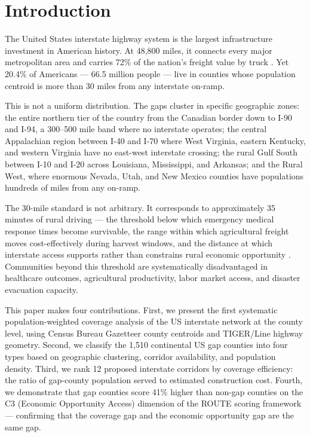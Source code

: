 \section{Introduction}

The United States interstate highway system is the largest infrastructure investment in American history. At 48,800 miles, it connects every major metropolitan area and carries 72\% of the nation's freight value by truck \citep{BTS2024}. Yet 20.4\% of Americans --- 66.5 million people --- live in counties whose population centroid is more than 30 miles from any interstate on-ramp.

This is not a uniform distribution. The gaps cluster in specific geographic zones: the entire northern tier of the country from the Canadian border down to I-90 and I-94, a 300--500 mile band where no interstate operates; the central Appalachian region between I-40 and I-70 where West Virginia, eastern Kentucky, and western Virginia have no east-west interstate crossing; the rural Gulf South between I-10 and I-20 across Louisiana, Mississippi, and Arkansas; and the Rural West, where enormous Nevada, Utah, and New Mexico counties have populations hundreds of miles from any on-ramp.

The 30-mile standard is not arbitrary. It corresponds to approximately 35 minutes of rural driving --- the threshold below which emergency medical response times become survivable, the range within which agricultural freight moves cost-effectively during harvest windows, and the distance at which interstate access supports rather than constrains rural economic opportunity \citep{USDA_ERS2020}. Communities beyond this threshold are systematically disadvantaged in healthcare outcomes, agricultural productivity, labor market access, and disaster evacuation capacity.

This paper makes four contributions. First, we present the first systematic population-weighted coverage analysis of the US interstate network at the county level, using Census Bureau Gazetteer county centroids and TIGER/Line highway geometry. Second, we classify the 1,510 continental US gap counties into four types based on geographic clustering, corridor availability, and population density. Third, we rank 12 proposed interstate corridors by coverage efficiency: the ratio of gap-county population served to estimated construction cost. Fourth, we demonstrate that gap counties score 41\% higher than non-gap counties on the C3 (Economic Opportunity Access) dimension of the ROUTE scoring framework --- confirming that the coverage gap and the economic opportunity gap are the same gap.

